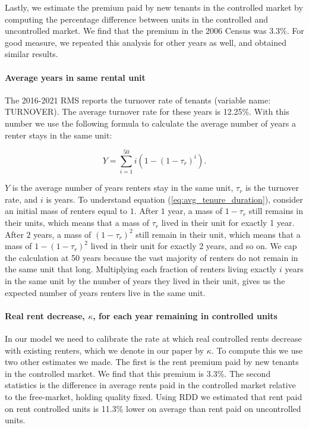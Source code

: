 \documentclass[parskip=full]{article}
\begin{document}
Lastly, we estimate the premium paid by new tenants in the controlled market by computing the percentage difference between units in the controlled and uncontrolled market. We find that the premium in the 2006 Census was 3.3\%. For good measure, we repeated this analysis for other years as well, and obtained similar results.

\paragraph{Average years in same rental unit}

The 2016-2021 RMS reports the turnover rate of tenants (variable name: TURNOVER). The average turnover rate for these years is 12.25\%. With this number we use the following formula to calculate the average number of years a renter stays in the same unit:

\begin{equation}\label{eq:avg_tenure_duration}
    Y=\sum_{i=1}^{50}i(1-(1-\tau_{r})^{i}).
\end{equation}

\noindent $Y$ is the average number of years renters stay in the same unit, $\tau_{r}$ is the turnover rate, and $i$ is years. To understand equation (\ref{eq:avg_tenure_duration}), consider an initial mass of renters equal to $1$. After $1$ year, a mass of $1-\tau_{r}$ still remains in their units, which means that a mass of $\tau_{r}$ lived in their unit for exactly 1 year. After $2$ years, a mass of $(1-\tau_{r})^2$ still remain in their unit, which means that a mass of $1-(1-\tau_{r})^2$ lived in their unit for exactly 2 years, and so on. We cap the calculation at 50 years because the vast majority of renters do not remain in the same unit that long. Multiplying each fraction of renters living exactly $i$ years in the same unit by the number of years they lived in their unit, gives us the expected number of years renters live in the same unit.

\paragraph{Real rent decrease, $\kappa$, for each year remaining in controlled units}

In our model we need to calibrate the rate at which real controlled rents decrease  with existing renters, which we denote in our paper by $\kappa$. To compute this we use two other estimates we made. The first is the rent premium paid by new tenants in the controlled market. We find that this premium is 3.3\%. The second statistics is the difference in average rents paid in the controlled market relative to the free-market, holding quality fixed. Using RDD we estimated that rent paid on rent controlled units is 11.3\% lower on average than rent paid on uncontrolled units. 
\end{document}
